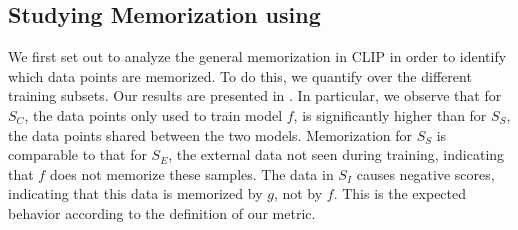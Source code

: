 \begin{figure}[t]
\end{figure}
\subsection{Studying Memorization using \ours}
We first set out to analyze the general memorization in CLIP in order to identify which data points are memorized.
To do this, we quantify \ours over the different training subsets. Our results are presented in . 
In particular, we observe that \ours for $S_C$, the data points only used to train model $f$, is significantly higher than for $S_S$, the data points shared between the two models. Memorization for $S_S$ is comparable to that for $S_E$, \ie the external data not seen during training, indicating that $f$ does not memorize these samples. The data in $S_I$ causes negative \ours scores, indicating that this data is memorized by $g$, not by $f$. This is the expected behavior according to the definition of our metric.

